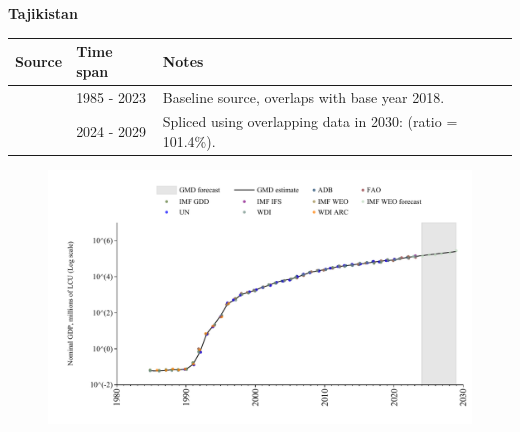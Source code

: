 \documentclass[12pt,a4paper,landscape]{article}
\begin{document}
\begin{adjustbox}{max totalsize={\paperwidth}{\paperheight},center}
\begin{minipage}[t][\textheight][t]{\textwidth}
\vspace*{0.5cm}
{}
\begin{center}
{\Large\bfseries Tajikistan}
\end{center}
\vspace{0.5cm}
\begin{table}[H]
\centering
\small
\begin{tabular}{|l|l|l|}
\hline
\textbf{Source} & \textbf{Time span} & \textbf{Notes} \\
\hline
\rowcolor{white}\cite{WDI}& 1985 - 2023 &Baseline source, overlaps with base year 2018.\\
\rowcolor{lightgray}\cite{IMF_WEO_forecast}& 2024 - 2029 &Spliced using overlapping data in 2030: (ratio = 101.4\%).\\
\hline
\end{tabular}
\end{table}
\begin{figure}[H]
\centering
\includegraphics[width=\textwidth,height=0.6\textheight,keepaspectratio]{graphs/TJK_nGDP.pdf}
\end{figure}
\end{minipage}
\end{adjustbox}
\end{document}
